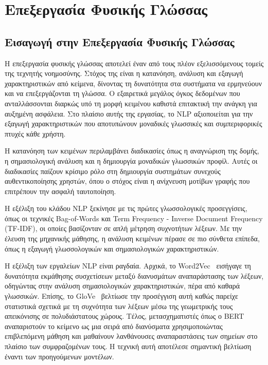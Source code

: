 \section{Επεξεργασία Φυσικής Γλώσσας}
\label{sec:theory_nlp}

\subsection{Εισαγωγή στην Επεξεργασία Φυσικής Γλώσσας}
Η επεξεργασία φυσικής γλώσσας αποτελεί έναν από τους πλέον εξελισσόμενους τομείς της τεχνητής νοημοσύνης. Στόχος της είναι η κατανόηση, ανάλυση και εξαγωγή χαρακτηριστικών από κείμενα, δίνοντας τη δυνατότητα στα συστήματα να ερμηνεύουν και να επεξεργάζονται τη γλώσσα. Ο εξαιρετικά μεγάλος όγκος δεδομένων που ανταλλάσσονται διαρκώς υπό τη μορφή κειμένου καθιστά επιτακτική την ανάγκη για αυξημένη ασφάλεια. Στο πλαίσιο αυτής της εργασίας, το NLP αξιοποιείται για την εξαγωγή χαρακτηριστικών που αποτυπώνουν μοναδικές γλωσσικές και συμπεριφορικές πτυχές κάθε χρήστη.

Η κατανόηση των κειμένων περιλαμβάνει διαδικασίες όπως η αναγνώριση της δομής, η σημασιολογική ανάλυση και η δημιουργία μοναδικών γλωσσικών προφίλ. Αυτές οι διαδικασίες παίζουν κρίσιμο ρόλο στη δημιουργία συστημάτων συνεχούς αυθεντικοποίησης χρηστών, όπου ο στόχος είναι η ανίχνευση μοτίβων γραφής που επιτρέπουν την ασφαλή ταυτοποίηση.

Η εξέλιξη του κλάδου NLP ξεκίνησε με τις πρώτες γλωσσολογικές προσεγγίσεις, όπως οι τεχνικές Bag-of-Words και Term Frequency - Inverse Document Frequency (TF-IDF), οι οποίες βασίζονταν σε απλή μέτρηση συχνοτήτων λέξεων. Με την έλευση της μηχανικής μάθησης, η ανάλυση κειμένων πέρασε σε πιο σύνθετα επίπεδα, όπως η εξαγωγή γλωσσολογικών και σημασιολογικών χαρακτηριστικών.

Η εξέλιξη των εργαλείων NLP είναι ραγδαία. Αρχικά, το Word2Vec~\cite{mikolov2013efficient} εισήγαγε τη δυνατότητα εκμάθησης συσχετίσεων μεταξύ διανυσμάτων αναπαράστασης των λέξεων, οδηγώντας στην ανάλυση σημασιολογικών χαρακτηριστικών, πέρα από καθαρά γλωσσικών. Επίσης, το GloVe~\cite{pennington2014glove} βελτίωσε την προσέγγιση αυτή καθώς παρείχε στατιστικά σχετικά με τη συχνότητα των λέξεων μέσω της γεωμετρικής τους απεικόνισης σε πολυδιάστατους χώρους. Τέλος, μετασχηματιστές όπως ο BERT~\cite{devlin2018bert} αναπαριστούν το κείμενο ως μια σειρά από διανύσματα χρησιμοποιώντας επιβλεπόμενη μάθηση και μαθαίνουν λανθάνουσες αναπαραστάσεις των σημείων στο πλαίσιο των συμφραζομένων τους. Η τεχνική αυτή αποτέλεσε σημαντική βελτίωση έναντι των προηγούμενων μοντέλων.

